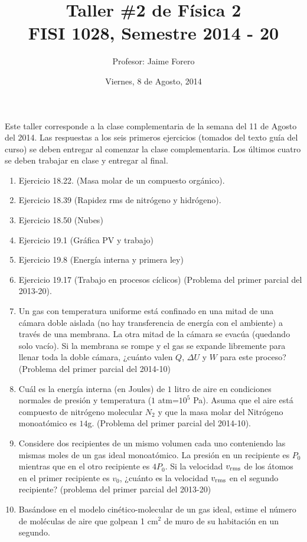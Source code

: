 \documentclass{article}
\title{Taller \#2 de F\'isica 2\\ FISI 1028, Semestre 2014 - 20}
\author{Profesor: Jaime Forero}
\date{Viernes, 8 de Agosto, 2014}
\begin{document}
\maketitle
\thispagestyle{empty}

\noindent
Este taller corresponde a la clase complementaria de la semana
del 11 de Agosto del 2014. Las respuestas a los seis primeros
ejercicios (tomados del texto gu\'ia del curso) se deben entregar al
comenzar la clase complementaria. Los \'ultimos cuatro se deben
trabajar en clase y entregar al final. 

\begin{enumerate}

\item Ejercicio 18.22. (Masa molar de un compuesto org\'anico).

\item Ejercicio 18.39 (Rapidez rms de nitr\'ogeno y hidr\'ogeno).

\item Ejercicio 18.50 (Nubes)

\item Ejercicio 19.1 (Gr\'afica PV y trabajo)

\item Ejercicio 19.8 (Energ\'ia interna y primera ley)

\item Ejercicio 19.17 (Trabajo en procesos c\'iclicos) (Problema del
  primer parcial del 2013-20).

\item
Un gas con temperatura uniforme está confinado en una mitad de una
cámara doble aislada (no hay transferencia de energía con el ambiente)
a través de una membrana. La otra mitad de la cámara se evacúa
(quedando solo vacío). Si la membrana se rompe y el gas se expande
libremente para llenar toda la doble cámara, ¿cuánto valen $Q$,
$\Delta U$ y $W$ para este proceso?  (Problema del primer
parcial del 2014-10) 

\item
Cu\'al es la energ\'ia interna (en Joules) de $1$ litro de aire en
condiciones normales de presi\'on y temperatura ($1$ atm=$10^5$ Pa).
Asuma que el aire est\'a compuesto de nitr\'ogeno molecular $N_2$ y
que la masa molar del Nitr\'ogeno monoat\'omico es $14$g. (Problema del
primer parcial del 2014-10).

\item 
Considere dos recipientes de un mismo volumen cada uno conteniendo las
mismas moles de un gas ideal monoat\'omico. La presi\'on en un
recipiente es $P_{0}$ mientras que en el otro recipiente es
$4P_{0}$. Si la velocidad $v_{\rm rms}$ de los \'atomos en el primer
recipiente es $v_{0}$, ¿cuánto es la velocidad $v_{\rm rms}$ en el segundo
recipiente? (problema del primer parcial del 2013-20)

\item
Bas\'andose en el modelo cin\'etico-molecular de un gas ideal, estime el n\'umero de mol\'eculas de aire que golpean 1 cm$^2$ de muro de su habitaci\'on en un segundo. 

\end{enumerate}
\end{document}
